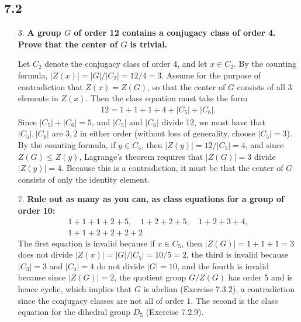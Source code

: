 \documentclass[a4paper,12pt]{article}
\begin{document}
\subsection*{7.2}
\begin{enumerate}
    \item[3.]
        \boldmath
        \textbf{A group $G$ of order 12 contains a conjugacy class of order 4. Prove that the center of $G$ is trivial.} \par
        \unboldmath
        Let $C_2$ denote the conjugacy class of order 4, and let $x \in C_2$. By the counting formula, $|Z(x)| = |G|/|C_2| = 12/4 = 3$. Assume for the purpose of contradiction that $Z(x) = Z(G)$, so that the center of $G$ consists of all 3 elements in $Z(x)$. Then the class equation must take the form
        \begin{align*}
            12 = 1 + 1 + 1 + 4 + |C_5| + |C_6|.
        \end{align*}
        Since $|C_5| + |C_6| = 5$, and $|C_5|$ and $|C_6|$ divide 12, we must have that $|C_5|, |C_6|$ are $3, 2$ in either order (without loss of generality, choose $|C_5| = 3$). By the counting formula, if $y \in C_5$, then $|Z(y)| = 12/|C_5| = 4$, and since $Z(G) \leq Z(y)$, Lagrange's theorem requires that $|Z(G)| = 3$ divide $|Z(y)| = 4$. Because this is a contradiction, it must be that the center of $G$ consists of only the identity element.

    \item[7.]
        \boldmath
        \textbf{Rule out as many as you can, as class equations for a group of order 10:}
        \begin{gather*}
            1 + 1 + 1 + 2 + 5, \quad 1 + 2 + 2 + 5, \quad 1 + 2 + 3 + 4, \\
            1 + 1 + 2 + 2 + 2 + 2
        \end{gather*}
        \unboldmath
        The first equation is invalid because if $x \in C_5$, then $|Z(G)| = 1 + 1 + 1 = 3$ does not divide $|Z(x)| = |G|/|C_5| = 10/5 = 2$, the third is invalid because $|C_3| = 3$ and $|C_4| = 4$ do not divide $|G| = 10$, and the fourth is invalid because since $|Z(G)| = 2$, the quotient group $G/Z(G)$ has order 5 and is hence cyclic, which implies that $G$ is abelian (Exercise 7.3.2), a contradiction since the conjugacy classes are not all of order $1$. The second is the class equation for the dihedral group $D_5$ (Exercise 7.2.9).


\end{enumerate}
\end{document}
